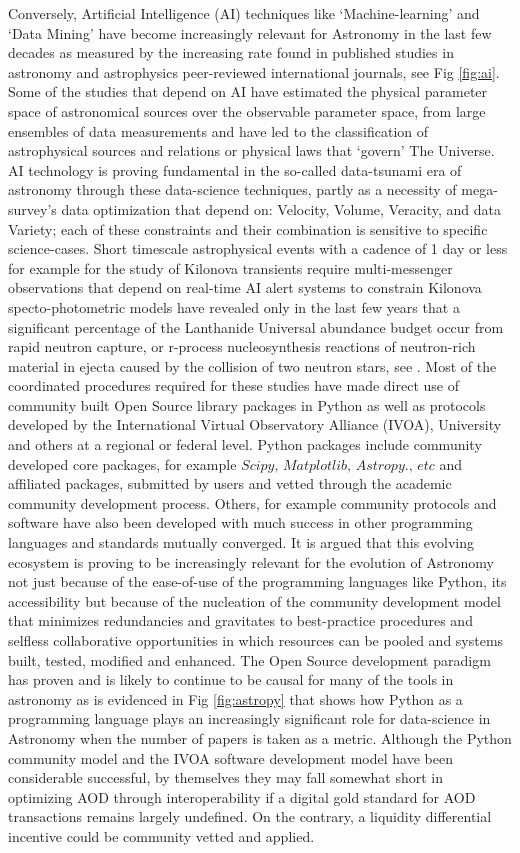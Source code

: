 \documentclass[final,5p,times,twocolumn,authoryear]{elsarticle}
\begin{document}
Conversely, Artificial Intelligence (AI) techniques like `Machine-learning' and `Data Mining'  have become increasingly relevant for Astronomy in the last few decades as measured by the increasing rate found in published studies in astronomy and astrophysics peer-reviewed international journals, see Fig \ref{fig:ai}. Some of the studies that depend on AI have estimated the physical parameter space of astronomical sources over the observable parameter space, from large ensembles of data measurements and have led to the classification of astrophysical sources and relations or physical laws that `govern' The Universe. AI technology is proving fundamental in the so-called data-tsunami era of astronomy through these data-science techniques, partly as a necessity of mega-survey's data optimization that depend on: Velocity, Volume, Veracity, and data Variety; each of these constraints and their combination is sensitive to specific science-cases. Short timescale astrophysical events with a cadence of 1 day or less for example for the study of Kilonova transients require multi-messenger observations that depend on real-time AI alert systems to constrain Kilonova specto-photometric models have revealed only in the last few years that a significant percentage of the Lanthanide Universal abundance budget occur from rapid neutron capture, or r-process nucleosynthesis reactions of neutron-rich material in 
 ejecta caused by the collision of two neutron stars, see \cite{artola2020}. Most of the coordinated procedures required for these studies have made direct use of community built Open Source library packages in Python as well as protocols developed by the International Virtual Observatory Alliance (IVOA), University and others at a regional or federal level. Python packages include community developed core packages, for example $\textit{Scipy, Matplotlib, Astropy., etc}$  and affiliated packages, submitted by users and vetted through the academic community development process. Others, for example community protocols and software have also been developed with much success in other programming languages and standards mutually converged. It is argued that this evolving ecosystem is proving to be increasingly relevant for the evolution of Astronomy not just because of the ease-of-use of the programming languages like Python, its accessibility but because of the nucleation of the community development model that minimizes redundancies and gravitates to best-practice procedures and selfless collaborative opportunities in which resources can be pooled and systems built, tested, modified and enhanced. The Open Source development paradigm has proven and is likely to continue to be causal for many of the tools in astronomy as is evidenced in Fig \ref{fig:astropy} that shows how Python as a programming language plays an increasingly significant role for data-science in Astronomy when the number of papers is taken as a metric.  Although the Python community model and the IVOA software development model have been considerable successful, by themselves they may fall somewhat short in optimizing AOD through interoperability if a digital gold standard for AOD transactions remains largely undefined. On the contrary, a liquidity differential incentive could be community vetted and applied. 
\end{document}
